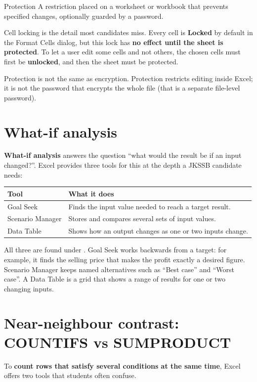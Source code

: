 \begin{definitionbox}{Protection}
A restriction placed on a worksheet or workbook that prevents specified changes,
optionally guarded by a password.
\end{definitionbox}

Cell locking is the detail most candidates miss. Every cell is \textbf{Locked}
by default in the Format Cells dialog, but this lock has \textbf{no effect until
the sheet is protected}. To let a user edit some cells and not others, the
chosen cells must first be \textbf{unlocked}, and then the sheet must be
protected.

Protection is not the same as encryption. Protection restricts editing inside
Excel; it is not the password that encrypts the whole file (that is a separate
file-level password).

\section{What-if analysis}
\textbf{What-if analysis} answers the question ``what would the result be if an
input changed?''. Excel provides three tools for this at the depth a JKSSB
candidate needs:

\begin{center}
\begin{tabular}{p{}p{}}
\toprule
\textbf{Tool} & \textbf{What it does} \\
\midrule
Goal Seek & Finds the input value needed to reach a target result. \\
Scenario Manager & Stores and compares several sets of input values. \\
Data Table & Shows how an output changes as one or two inputs change. \\
\bottomrule
\end{tabular}
\end{center}

All three are found under . Goal Seek works
backwards from a target: for example, it finds the selling price that makes the
profit exactly a desired figure. Scenario Manager keeps named alternatives such
as ``Best case'' and ``Worst case''. A Data Table is a grid that shows a range
of results for one or two changing inputs.

\section{Near-neighbour contrast: COUNTIFS vs SUMPRODUCT}
To \textbf{count rows that satisfy several conditions at the same time}, Excel
offers two tools that students often confuse.

